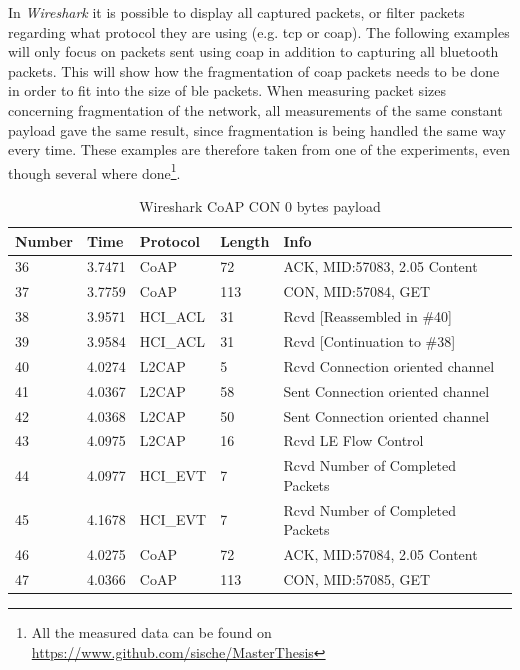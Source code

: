 



\noindent In \textit{Wireshark} it is possible to display all captured packets, or filter packets regarding what protocol they are using (e.g. \gls{tcp} or \gls{coap}). The following examples will only focus on packets sent using \gls{coap} in addition to capturing all bluetooth packets. This will show how the fragmentation of \gls{coap} packets needs to be done in order to fit into the size of \gls{ble} packets. When measuring packet sizes concerning fragmentation of the network, all measurements of the same constant \gls{payload} gave the same result, since fragmentation is being handled the same way every time. These examples are therefore taken from one of the experiments, even though several where done\footnote{All the measured data can be found on \url{https://www.github.com/sische/MasterThesis}}. 

\begin{table}[ht]
\centering
\caption{Wireshark CoAP CON 0 bytes payload}
\label{coapCON0table}
\begin{tabular}{lllll}
Number & Time   & Protocol & Length & Info                             \\ \hline
36     & 3.7471 & CoAP     & 72     & ACK, MID:57083, 2.05 Content     \\
37     & 3.7759 & CoAP     & 113    & CON, MID:57084, GET              \\
38     & 3.9571 & HCI\_ACL & 31     & Rcvd {[}Reassembled in \#40{]}   \\
39     & 3.9584 & HCI\_ACL & 31     & Rcvd {[}Continuation to \#38{]}  \\
40     & 4.0274 & L2CAP    & 5      & Rcvd Connection oriented channel \\
41     & 4.0367 & L2CAP    & 58     & Sent Connection oriented channel \\
42     & 4.0368 & L2CAP    & 50     & Sent Connection oriented channel \\
43     & 4.0975 & L2CAP    & 16     & Rcvd LE Flow Control             \\
44     & 4.0977 & HCI\_EVT & 7      & Rcvd Number of Completed Packets \\
45     & 4.1678 & HCI\_EVT & 7      & Rcvd Number of Completed Packets \\
46     & 4.0275 & CoAP     & 72     & ACK, MID:57084, 2.05 Content     \\
47     & 4.0366 & CoAP     & 113    & CON, MID:57085, GET              \\ \hline
\end{tabular}
\end{table}

